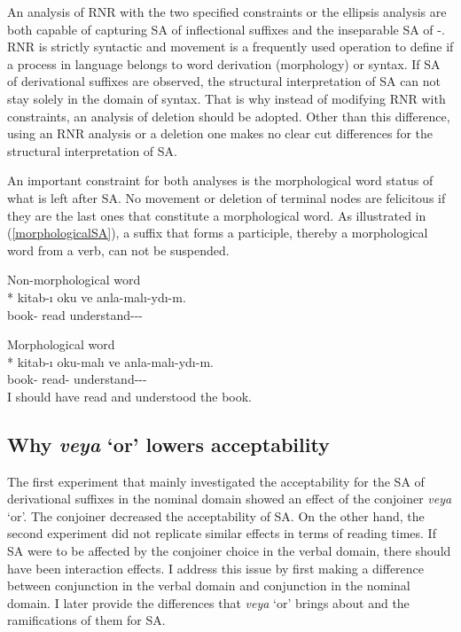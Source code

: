 An analysis of RNR with the two specified constraints or the ellipsis analysis are both capable of capturing SA of inflectional suffixes and the inseparable SA of {\Pl-\Poss}. RNR is strictly syntactic and movement is a frequently used operation to define if a process in language belongs to word derivation (morphology) or syntax. If SA of derivational suffixes are observed, the structural interpretation of SA can not stay solely in the domain of syntax. That is why instead of modifying RNR with constraints, an analysis of deletion should be adopted. Other than this difference, using an RNR analysis or a deletion one makes no clear cut differences for the structural interpretation of SA.

An important constraint for both analyses is the morphological word status of what is left after SA. No movement or deletion of terminal nodes are felicitous if they are the last ones that constitute a morphological word. As illustrated in (\ref{morphologicalSA}), a suffix that forms a participle, thereby a morphological word from a verb, can not be suspended.

\begin{exe}
    \ex \label{morphologicalSA}
    \begin{xlist}
    \ex Non-morphological word\\*
    \gll *kitab-ı oku ve anla-malı-ydı-m. \\ 
    book-{\Acc} read {\And} understand-{\Nec}-{\Pst}-{\Fsg} \\
    \glt ${}$
    
    \ex Morphological word\\*
    \gll kitab-ı oku-malı ve anla-malı-ydı-m. \\
    book-{\Acc} read-{\Nec} {\And} understand-{\Nec}-{\Pst}-{\Fsg} \\
    \glt I should have read and understood the book.
    \end{xlist}
\end{exe}

\subsection{Why \textit{veya} `or' lowers acceptability}

The first experiment that mainly investigated the acceptability for the SA of derivational suffixes in the nominal domain showed an effect of the conjoiner \textit{veya} `or'. The conjoiner decreased the acceptability of {\Case} SA. On the other hand, the second experiment did not replicate similar effects in terms of reading times. If SA were to be affected by the conjoiner choice in the verbal domain, there should have been interaction effects. I address this issue by first making a difference between conjunction in the verbal domain and conjunction in the nominal domain. I later provide the differences that \textit{veya} `or' brings about and the ramifications of them for SA. 

